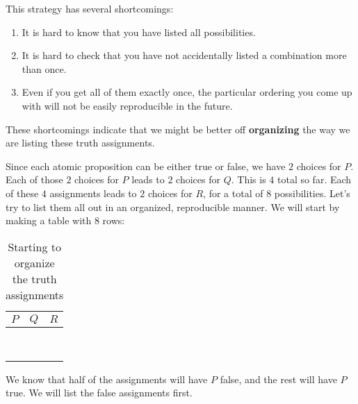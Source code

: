 This strategy has several shortcomings:

\begin{enumerate}
	\item It is hard to know that you have listed all possibilities.
	\item It is hard to check that you have not accidentally listed a combination more than once.
	\item Even if you get all of them exactly once, the particular ordering you come up with will not be easily reproducible in the future.
\end{enumerate}

These shortcomings indicate that we might be better off \textbf{organizing} the way we are listing these truth assignments.

Since each atomic proposition can be either true or false, we have $2$ choices for $P$.  Each of those $2$ choices for $P$ leads to $2$ choices for $Q$.  This is $4$ total so far.  Each of these $4$ assignments leads to $2$ choices for $R$, for a total of $8$ possibilities.  Let's try to list them all out in an organized, reproducible manner.  We will start by making a table with 8 rows:

\begin{table}[h!]
	\begin{center}
		\caption{Starting to organize the truth assignments}
		\begin{tabular}{c|c|c} 
			$P$ & $Q$ & $R$ \\
			\hline
			&  &  \\  \hline
			&  &  \\  \hline
			&  &  \\  \hline
			&  &  \\  \hline
			&  &  \\  \hline
			&  &  \\  \hline
			&  &  \\  \hline
			&  &  \\  \hline
		\end{tabular}
	\end{center}
\end{table}

We know that half of the assignments will have $P$ false, and the rest will have $P$ true.  We will list the false assignments first.


